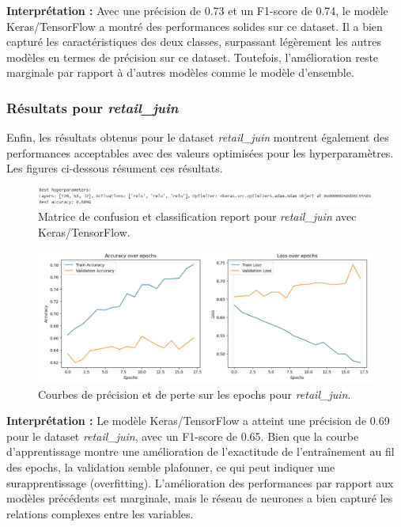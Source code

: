 \textbf{Interprétation :} Avec une précision de 0.73 et un F1-score de 0.74, le modèle Keras/TensorFlow a montré des performances solides sur ce dataset. Il a bien capturé les caractéristiques des deux classes, surpassant légèrement les autres modèles en termes de précision sur ce dataset. Toutefois, l'amélioration reste marginale par rapport à d'autres modèles comme le modèle d'ensemble.

\subsubsection{Résultats pour \textit{retail\_juin}}

Enfin, les résultats obtenus pour le dataset \textit{retail\_juin} montrent également des performances acceptables avec des valeurs optimisées pour les hyperparamètres. Les figures ci-dessous résument ces résultats.

\begin{figure}[H]
    \centering
    \includegraphics[width=0.8\linewidth]{capture_modele_30.png}
    \caption{Matrice de confusion et classification report pour \textit{retail\_juin} avec Keras/TensorFlow.}
\end{figure}

\begin{figure}[H]
    \centering
    \includegraphics[width=0.8\linewidth]{capture_modele_31.png}
    \caption{Courbes de précision et de perte sur les epochs pour \textit{retail\_juin}.}
    \label{fig:curves_juin_keras}
\end{figure}

\textbf{Interprétation :} Le modèle Keras/TensorFlow a atteint une précision de 0.69 pour le dataset \textit{retail\_juin}, avec un F1-score de 0.65. Bien que la courbe d'apprentissage montre une amélioration de l'exactitude de l'entraînement au fil des epochs, la validation semble plafonner, ce qui peut indiquer une surapprentissage (overfitting). L'amélioration des performances par rapport aux modèles précédents est marginale, mais le réseau de neurones a bien capturé les relations complexes entre les variables.

